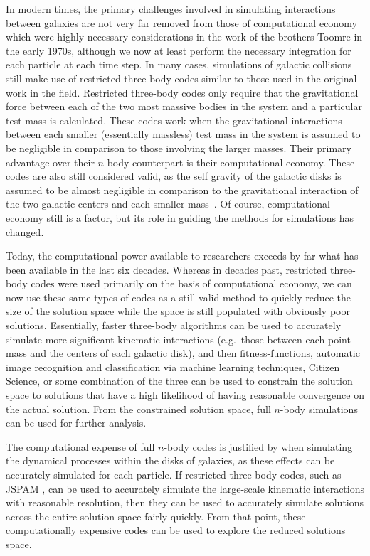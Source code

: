 In modern times, the primary challenges involved in simulating
interactions between galaxies are not very far removed from those of
computational economy which were highly necessary considerations in the work
of the brothers Toomre in the early 1970s, although we now at least perform
the necessary integration for each particle at each time step.
In many cases, simulations of galactic collisions still make use of restricted
three-body codes similar to those used in the original work in the field.
Restricted three-body codes
only require that the gravitational force between each of the two most massive
bodies in the system and a particular test mass is calculated. These codes work
when the gravitational interactions between each smaller (essentially massless)
test mass in the system is assumed to be negligible in comparison to those
involving the larger masses.
Their primary advantage over their $n$-body counterpart is their computational
economy.
These codes are also still considered valid, as the self gravity of the galactic
disks is assumed to be almost negligible in comparison to the gravitational
interaction of the two galactic centers and each smaller mass~\cite{Toomre1972}.
Of course, computational economy still is a factor, but its role in guiding
the methods for simulations has changed.

Today, the computational power available to researchers
exceeds by far what has been available in the last six decades.
Whereas in decades past, restricted three-body codes were used
primarily on the basis of computational economy, we can now use these same
types of codes as a still-valid method to quickly reduce the size of the
solution space while the space is still populated with
obviously poor solutions.
Essentially, faster three-body algorithms can be used
to accurately simulate more significant kinematic interactions
(e.g.\ those between each point mass and the centers of each galactic disk),
and then fitness-functions,
automatic image recognition and classification via machine learning techniques,
Citizen Science, or some combination of the three can be used to constrain
the solution space to solutions that have a high likelihood of having
reasonable convergence on the actual solution. From the constrained solution
space, full $n$-body simulations can be used for further analysis.

The computational expense of full $n$-body codes is justified by
when simulating the dynamical processes within the disks of galaxies, as these
effects can be accurately simulated for each particle.
If restricted three-body codes, such as JSPAM \cite{Wallin2016}, can be
used to accurately simulate the large-scale kinematic interactions with
reasonable resolution, then they can be used to accurately simulate solutions
across the entire solution space fairly quickly.
From that point, these computationally expensive codes can be used to explore
the reduced solutions space.

